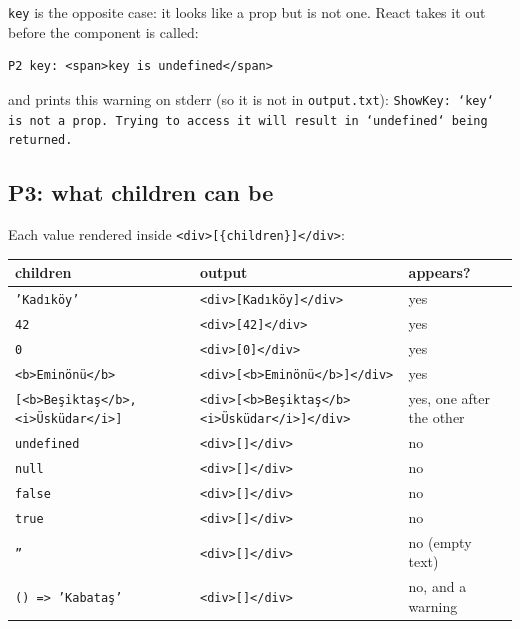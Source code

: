 \documentclass[
  10pt,
]{article}
\begin{document}
\texttt{key} is the opposite case: it looks like a prop but is not one.
React takes it out before the component is called:

\begin{verbatim}
P2 key: <span>key is undefined</span>
\end{verbatim}

and prints this warning on stderr (so it is not in
\texttt{output.\allowbreak{}txt}):
\texttt{ShowKey:\allowbreak{} `key` is not a prop.\allowbreak{} Trying to access it will result in `undefined` being returned.\allowbreak{}}

\hypertarget{p3-what-children-can-be}{%
\subsection{P3: what children can be}\label{p3-what-children-can-be}}

Each value rendered inside
\texttt{<div>[\allowbreak{}\{children\}]</\allowbreak{}div>}:

\begin{longtable}[]{@{}>{\raggedright\arraybackslash}p{}>{\raggedright\arraybackslash}p{}>{\raggedright\arraybackslash}p{}@{}}
\toprule\noalign{}
children & output & appears? \\
\midrule\noalign{}
\endhead
\bottomrule\noalign{}
\endlastfoot
\texttt{'Kadıköy'} &
\texttt{<div>[\allowbreak{}Kadıköy]</\allowbreak{}div>} & yes \\
\texttt{42} & \texttt{<div>[\allowbreak{}42]</\allowbreak{}div>} &
yes \\
\texttt{0} & \texttt{<div>[\allowbreak{}0]</\allowbreak{}div>} & yes \\
\texttt{<b>Eminönü</\allowbreak{}b>} &
\texttt{<div>[\allowbreak{}<b>Eminönü</\allowbreak{}b>]</\allowbreak{}div>}
& yes \\
\texttt{[\allowbreak{}<b>Beşiktaş</\allowbreak{}b>,\allowbreak{} <i>Üsküdar</\allowbreak{}i>]}
&
\texttt{<div>[\allowbreak{}<b>Beşiktaş</\allowbreak{}b><i>Üsküdar</\allowbreak{}i>]</\allowbreak{}div>}
& yes, one after the other \\
\texttt{undefined} & \texttt{<div>[\allowbreak{}]</\allowbreak{}div>} &
no \\
\texttt{null} & \texttt{<div>[\allowbreak{}]</\allowbreak{}div>} & no \\
\texttt{false} & \texttt{<div>[\allowbreak{}]</\allowbreak{}div>} &
no \\
\texttt{true} & \texttt{<div>[\allowbreak{}]</\allowbreak{}div>} & no \\
\texttt{''} & \texttt{<div>[\allowbreak{}]</\allowbreak{}div>} & no
(empty text) \\
\texttt{(\allowbreak{}) =\allowbreak{}> 'Kabataş'} &
\texttt{<div>[\allowbreak{}]</\allowbreak{}div>} & no, and a warning \\
\end{longtable}
\end{document}
